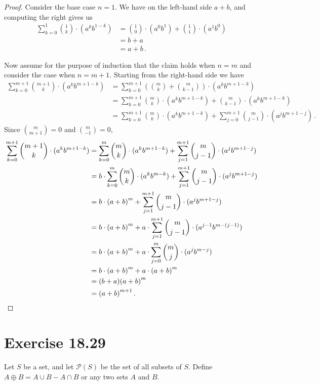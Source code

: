 \documentclass{abrice}
\renewcommand{\P}{\mathscr{P}}
\begin{document}
\begin{proof}
  Consider the base case $n = 1$. We have on the left-hand side $a + b$, and
  computing the right gives us
  \begin{align*}
    \sum_{k=0}^1 {1 \choose k} \cdot (a^k b^{1-k})
    &= {1 \choose 0} \cdot (a^0b^1) + {1 \choose 1} \cdot (a^1b^0) \\
    &= b + a \\
    &= a + b\, .
  \end{align*}

  Now assume for the purpose of induction that the claim holds when $n = m$ and
  consider the case when $n = m + 1$. Starting from the right-hand side we have
  \begin{align*}
    \sum_{k=0}^{m+1} {m + 1 \choose k} \cdot (a^k b^{m+1-k})
    &= \sum_{k=0}^{m+1} \left(  {m \choose k} + {m \choose k-1 } \right) \cdot
      (a^k b^{m+1-k}) \\
    &= \sum_{k=0}^{m+1} {m \choose k} \cdot (a^k b^{m+1-k}) + {m \choose k-1}
      \cdot (a^k b^{m+1-k}) \\
    &= \sum_{k=0}^{m+1} {m \choose k} \cdot (a^k b^{m+1-k}) + \sum_{j=0}^{m+1} {m \choose j-1}
      \cdot (a^j b^{m+1-j})\, .
  \end{align*}
  Since ${m \choose m + 1} = 0$ and ${m \choose -1} = 0$,
  \begin{align*}
    \sum_{k=0}^{m+1} {m + 1 \choose k} \cdot (a^k b^{m+1-k})
    &= \sum_{k=0}^{m} {m \choose k} \cdot (a^k b^{m+1-k}) + \sum_{j=1}^{m+1} {m \choose j-1}
      \cdot (a^j b^{m+1-j}) \\
    &= b \cdot \sum_{k=0}^{m} {m \choose k} \cdot (a^k b^{m-k}) +
      \sum_{j=1}^{m+1} {m \choose j-1}
      \cdot (a^j b^{m+1-j}) \\
    &= b \cdot {(a + b)}^m + \sum_{j=1}^{m+1} {m \choose j-1} \cdot (a^j
      b^{m+1-j}) \\
    &= b \cdot {(a + b)}^m + a \cdot \sum_{j=1}^{m+1} {m \choose j-1} \cdot
      (a^{j-1} b^{m-(j-1)}) \\
    &= b \cdot {(a + b)}^m + a \cdot \sum_{j=0}^{m} {m \choose j} \cdot
      (a^{j} b^{m-j}) \\
    &= b \cdot {(a + b)}^m + a \cdot {(a + b)}^m \\
    &= (b + a){(a + b)}^m \\
    &= {(a + b)}^{m+1}\, . \qedhere
  \end{align*}
\end{proof}

\section{Exercise 18.29}

Let $S$ be a set, and let $\P(S)$ be the set of all subsets of $S$. Define $A
\oplus B = A \cup B - A \cap B$ or any two sets $A$ and $B$.
\end{document}
